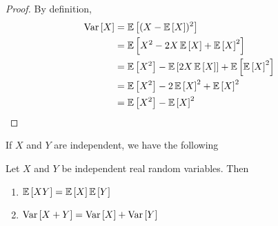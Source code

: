\begin{proof}
    By definition,
    \begin{align*}\variance{X}
         & = \expectation{(X - \expectation{X})^2}                                                 \\
         & = \expectation{X^2 - 2X\expectation{X} + \expectation{X}^2}                             \\
         & = \expectation{X^2} - \expectation{2X\expectation{X}} + \expectation{\expectation{X}^2} \\
         & = \expectation{X^2} - 2\expectation{X}^2 + \expectation{X}^2                            \\
         & = \expectation{X^2} - \expectation{X}^2\qedhere
    \end{align*}
\end{proof}

If $X$ and $Y$ are independent, we have the following
\begin{theorem}
    Let $X$ and $Y$ be independent real random variables. Then
    \begin{enumerate}[label=(\arabic*)]
        \item $\expectation{XY} = \expectation{X}\expectation{Y}$ \label{item:expvalprod}
        \item $\operatorname{\operatorname{Var}}\left[X + Y\right] = \operatorname{\operatorname{Var}}\left[X\right] + \operatorname{\operatorname{Var}}\left[Y\right]$
    \end{enumerate}
\end{theorem}

